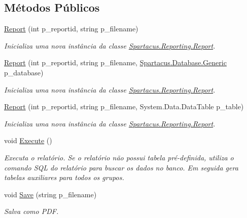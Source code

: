 \subsection*{Métodos Públicos}
\begin{DoxyCompactItemize}
\item 
\hyperlink{classSpartacus_1_1Reporting_1_1Report_afd782e43c614cea90611b30b419d560c}{Report} (int p\+\_\+reportid, string p\+\_\+filename)
\begin{DoxyCompactList}\small\item\em Inicializa uma nova instância da classe \hyperlink{classSpartacus_1_1Reporting_1_1Report}{Spartacus.\+Reporting.\+Report}. \end{DoxyCompactList}\item 
\hyperlink{classSpartacus_1_1Reporting_1_1Report_a8681c7155a9260ed9a14e48ab9c23d4c}{Report} (int p\+\_\+reportid, string p\+\_\+filename, \hyperlink{classSpartacus_1_1Database_1_1Generic}{Spartacus.\+Database.\+Generic} p\+\_\+database)
\begin{DoxyCompactList}\small\item\em Inicializa uma nova instância da classe \hyperlink{classSpartacus_1_1Reporting_1_1Report}{Spartacus.\+Reporting.\+Report}. \end{DoxyCompactList}\item 
\hyperlink{classSpartacus_1_1Reporting_1_1Report_ae51a138e5449202283c5f78c7cfba43a}{Report} (int p\+\_\+reportid, string p\+\_\+filename, System.\+Data.\+Data\+Table p\+\_\+table)
\begin{DoxyCompactList}\small\item\em Inicializa uma nova instância da classe \hyperlink{classSpartacus_1_1Reporting_1_1Report}{Spartacus.\+Reporting.\+Report}. \end{DoxyCompactList}\item 
void \hyperlink{classSpartacus_1_1Reporting_1_1Report_ad229668d54d0becc90678829f7357861}{Execute} ()
\begin{DoxyCompactList}\small\item\em Executa o relatório. Se o relatório não possui tabela pré-\/definida, utiliza o comando S\+Q\+L do relatório para buscar os dados no banco. Em seguida gera tabelas auxiliares para todos os grupos. \end{DoxyCompactList}\item 
void \hyperlink{classSpartacus_1_1Reporting_1_1Report_a0bab6af7d26031d5bf80384a0fb6082c}{Save} (string p\+\_\+filename)
\begin{DoxyCompactList}\small\item\em Salva como P\+D\+F. \end{DoxyCompactList}\end{DoxyCompactItemize}
